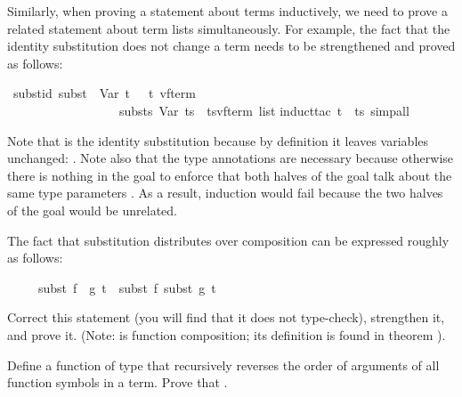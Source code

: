 \begin{isabellebody}
\begin{isamarkuptext}
Similarly, when proving a statement about terms inductively, we need
to prove a related statement about term lists simultaneously. For example,
the fact that the identity substitution does not change a term needs to be
strengthened and proved as follows:%
\end{isamarkuptext}%
\isamarkupfalse%
\ subst{\isacharunderscore}id{\isacharcolon}\ {\isachardoublequote}subst\ \ Var\ t\ \ {\isacharequal}\ {\isacharparenleft}t\ {\isacharcolon}{\isacharcolon}{\isacharparenleft}{\isacharprime}v{\isacharcomma}{\isacharprime}f{\isacharparenright}term{\isacharparenright}\ \ {\isasymand}\isanewline
\ \ \ \ \ \ \ \ \ \ \ \ \ \ \ \ \ \ substs\ Var\ ts\ {\isacharequal}\ {\isacharparenleft}ts{\isacharcolon}{\isacharcolon}{\isacharparenleft}{\isacharprime}v{\isacharcomma}{\isacharprime}f{\isacharparenright}term\ list{\isacharparenright}{\isachardoublequote}\isanewline
%
\isadelimproof
%
\endisadelimproof
%
\isatagproof
\isamarkupfalse%
induct{\isacharunderscore}tac\ t\ \ ts{\isacharcomma}\ simp{\isacharunderscore}all{\isacharparenright}\isanewline
\isamarkupfalse%
%
\endisatagproof
{\isafoldproof}%
%
\isadelimproof
%
\endisadelimproof
\isamarkuptrue%
%
\begin{isamarkuptext}%
\noindent
Note that  is the identity substitution because by definition it
leaves variables unchanged: . Note also
that the type annotations are necessary because otherwise there is nothing in
the goal to enforce that both halves of the goal talk about the same type
parameters . As a result, induction would fail
because the two halves of the goal would be unrelated.

\begin{exercise}
The fact that substitution distributes over composition can be expressed
roughly as follows:
\begin{isabelle}%
\ \ \ \ \ subst\ {\isacharparenleft}f\ {\isasymcirc}\ g{\isacharparenright}\ t\ {\isacharequal}\ subst\ f\ {\isacharparenleft}subst\ g\ t{\isacharparenright}%
\end{isabelle}
Correct this statement (you will find that it does not type-check),
strengthen it, and prove it. (Note: \isa{{\isasymcirc}} is function composition;
its definition is found in theorem ).
\end{exercise}
\begin{exercise}\label{ex:trev-trev}
  Define a function  of type 
that recursively reverses the order of arguments of all function symbols in a
  term. Prove that .
\end{exercise}


\end{isamarkuptext}
\end{isabellebody}
